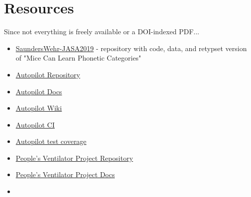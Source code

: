





\section{Resources}

Since not everything is freely available or a DOI-indexed PDF...

\begin{itemize}
\item \href{https://github.com/wehr-lab/SaundersWehr-JASA2019}{SaundersWehr-JASA2019} - repository with code, data, and retypset version of "Mice Can Learn Phonetic Categories"
\item \href{https://github.com/wehr-lab/autopilot}{Autopilot Repository}
\item \href{https://docs.auto-pi-lot.com}{Autopilot Docs}
\item \href{https://wiki.auto-pi-lot.com}{Autopilot Wiki}
\item \href{https://app.travis-ci.com/github/wehr-lab/autopilot/branches}{Autopilot CI}
\item \href{https://coveralls.io/github/wehr-lab/autopilot}{Autopilot test coverage}
\item \href{https://github.com/CohenLabPrinceton/pvp}{People's Ventilator Project Repository}
\item \href{https://www.peoplesvent.org/en/latest/index.html}{People's Ventilator Project Docs}
\item 
\end{itemize}
